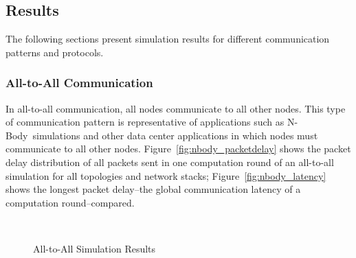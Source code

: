 
\subsection {Results}

The following sections present simulation results for different communication patterns and protocols.


\subsubsection{All-to-All Communication}\label{sec:all-to-all-communication}
\newcommand{\nbody}{N-Body}
In all-to-all communication, all nodes communicate to all other nodes.  This type of communication pattern is representative of applications such as \nbody~simulations and other data center applications in which nodes must communicate to all other nodes. Figure~\ref{fig:nbody_packetdelay} shows the packet delay distribution of all packets sent in one computation round of an all-to-all simulation for all topologies and network stacks; Figure~\ref{fig:nbody_latency} shows the longest packet delay--the global communication latency of a computation round--compared.

\captionsetup[subfloat]{captionskip=-0.003in}
\begin{figure}
    \centering
    \\
    \vspace{-0.1in}
    \vspace{-0.07in}
    \caption{All-to-All Simulation Results}
    \label{fig:common_topos}
\end{figure}

